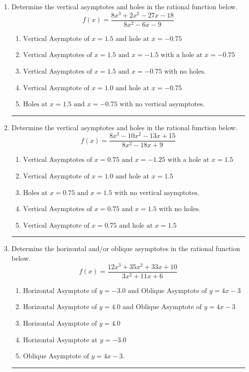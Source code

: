\documentclass[14pt]{extbook}
\newcommand{\litem}[1]{\item#1\hspace*{-1cm}\rule{\textwidth}{0.4pt}}
\begin{document}
\begin{enumerate}
{\begin{enumerate}[label=\Alph*.]
\end{enumerate} }
\litem{
Determine the vertical asymptotes and holes in the rational function below.\[ f(x) = \frac{8x^{3} +2 x^{2} -27 x -18}{8x^{2} -6 x -9} \]\begin{enumerate}[label=\Alph*.]
\item \( \text{Vertical Asymptote of } x = 1.5 \text{ and hole at } x = -0.75 \)
\item \( \text{Vertical Asymptotes of } x = 1.5 \text{ and } x = -1.5 \text{ with a hole at } x = -0.75 \)
\item \( \text{Vertical Asymptotes of } x = 1.5 \text{ and } x = -0.75 \text{ with no holes.} \)
\item \( \text{Vertical Asymptote of } x = 1.0 \text{ and hole at } x = -0.75 \)
\item \( \text{Holes at } x = 1.5 \text{ and } x = -0.75 \text{ with no vertical asymptotes.} \)

\end{enumerate} }
\litem{
Determine the vertical asymptotes and holes in the rational function below.\[ f(x) = \frac{8x^{3} -10 x^{2} -13 x + 15}{8x^{2} -18 x + 9} \]\begin{enumerate}[label=\Alph*.]
\item \( \text{Vertical Asymptotes of } x = 0.75 \text{ and } x = -1.25 \text{ with a hole at } x = 1.5 \)
\item \( \text{Vertical Asymptote of } x = 1.0 \text{ and hole at } x = 1.5 \)
\item \( \text{Holes at } x = 0.75 \text{ and } x = 1.5 \text{ with no vertical asymptotes.} \)
\item \( \text{Vertical Asymptotes of } x = 0.75 \text{ and } x = 1.5 \text{ with no holes.} \)
\item \( \text{Vertical Asymptote of } x = 0.75 \text{ and hole at } x = 1.5 \)

\end{enumerate} }
\litem{
Determine the horizontal and/or oblique asymptotes in the rational function below.\[ f(x) = \frac{12x^{3} +35 x^{2} +33 x + 10}{3x^{2} +11 x + 6} \]\begin{enumerate}[label=\Alph*.]
\item \( \text{Horizontal Asymptote of } y = -3.0 \text{ and Oblique Asymptote of } y = 4x -3 \)
\item \( \text{Horizontal Asymptote of } y = 4.0 \text{ and Oblique Asymptote of } y = 4x -3 \)
\item \( \text{Horizontal Asymptote of } y = 4.0  \)
\item \( \text{Horizontal Asymptote at } y = -3.0 \)
\item \( \text{Oblique Asymptote of } y = 4x -3. \)


\end{enumerate}}
\end{enumerate}
\end{document}
